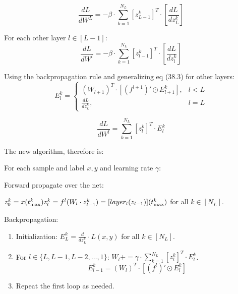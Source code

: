\begin{equation}
\frac{dL}{dW^L} = -\beta \cdot \sum_{k=1}^{N_L} [z_{L-1}^k]^T \cdot \left[\frac{dL}{dz_L^k}\right]
\end{equation}

For each other layer \(l \in [L-1]\):
\begin{equation}
\frac{dL}{dW^l} = -\beta \cdot \sum_{k=1}^{N_L} [z_{l-1}^k]^T \cdot \left[\frac{dL}{dz_l^k}\right]
\end{equation}

Using the backpropagation rule and generalizing eq (38.3) for other layers:
\begin{equation}
E_l^k = \begin{cases} (W_{l+1})^T \cdot [(f^{l+1})' \odot E_{l+1}^k], & l < L \\ \frac{dL}{dz_L^k}, & l = L \end{cases}
\end{equation}

\begin{equation}
\frac{dL}{dW^l} = \sum_{k=1}^{N_L} [z_l^k]^T \cdot E_l^k
\end{equation}

The new algorithm, therefore is:

\begin{mdframed}[backgroundcolor=green_background, linecolor=black, linewidth=2pt, frametitle=\textbf{Pseudo-code}] \label{pscode:BP-time}

For each sample and label \(x,y\) and learning rate \(\gamma\):

Forward propagate over the net:

\(z_0^k = x(t_{\text{max}}^k) \\ z_l^k = f^l (W_l \cdot z_{l-1}^k) = [layer_l (z_{l-1})](t_{\text{max}}^k)\) for all \(k \in [N_L]\).

Backpropagation:

\begin{enumerate}
    \item Initialization:
    \(E_L^k = \frac{d}{dz_L^k} \cdot L(x,y)\) for all \(k \in [N_L]\).

    \item For \(l \in \{L, L-1, L-2, \ldots, 1\}\):
    \(W_l += \gamma \cdot \sum_{k=1}^{N_L} [z_l^k]^T \cdot E_l^k\).
    \[E_{l-1}^k = (W_l)^T \cdot [(f^l)' \odot E_l^k] \]

    \item Repeat the first loop as needed.
    
\end{enumerate}

\end{mdframed}


